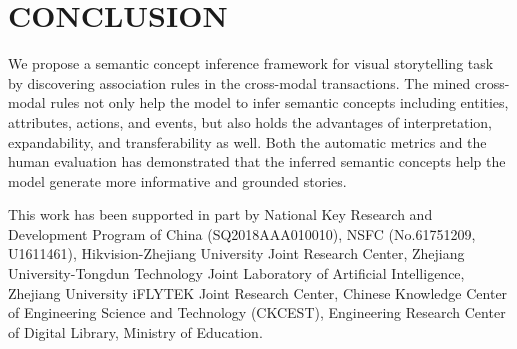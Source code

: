 \documentclass[sigconf]{acmart}
\begin{document}
\section{CONCLUSION}
We propose a semantic concept inference framework for visual storytelling task by discovering association rules in the cross-modal transactions. The mined cross-modal rules not only help the model to infer semantic concepts including entities, attributes, actions, and events, but also holds the advantages of interpretation, expandability, and transferability as well. Both the automatic metrics and the human evaluation has demonstrated that the inferred semantic concepts help the model generate more informative and grounded stories.

\begin{acks}
This work has been supported in part by National Key Research and Development Program of China (SQ2018AAA010010), NSFC (No.61751209, U1611461), Hikvision-Zhejiang University Joint Research Center, Zhejiang University-Tongdun Technology Joint Laboratory of Artificial Intelligence, Zhejiang University iFLYTEK Joint Research Center, Chinese Knowledge Center of Engineering Science and Technology (CKCEST), Engineering Research Center of Digital Library, Ministry of Education.
\end{acks}


\balance

\end{document}
